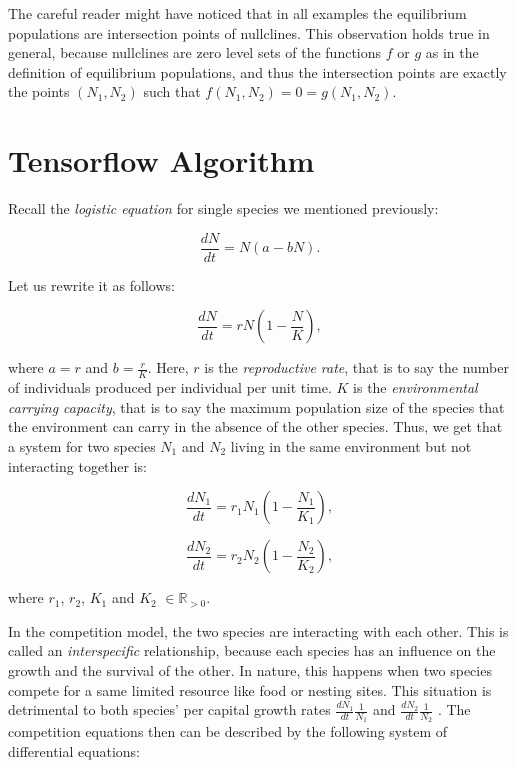 \documentclass[11pt,a4paper]{scrartcl}
\theoremstyle{definition}
\begin{document}
The careful reader might have noticed that in all examples the equilibrium populations are intersection points of nullclines. This observation holds true in general, because nullclines are zero level sets of the functions $f$ or $g$ as in the definition of equilibrium populations, and thus the intersection points are exactly the points $(N_1,N_2)$ such that $f(N_1,N_2)=0=g(N_1,N_2)$.

\FloatBarrier

\section{Tensorflow Algorithm}

Recall the \textit{logistic equation} for single species we mentioned previously:

\begin{equation} \tag{3}
	\frac{dN}{dt}=N(a-bN). 
\end{equation}

Let us rewrite it as follows:

\begin{equation} \label{eq9}
	\frac{dN}{dt}=rN(1-\frac{N}{K}), 
\end{equation}

where $a=r$ and $b=\frac{r}{K}$. Here, $r$ is the \textit{reproductive rate}, that is to say the number of individuals produced per individual per unit time. $K$ is the \textit{environmental carrying capacity}, that is to say the maximum population size of the species that the environment can carry in the absence of the other species\cite{Murray}. Thus, we get that a system for two species $N_1$ and $N_2$ living in the same environment but not interacting together is:

\begin{equation} \label{eq10}
	\frac{dN_1}{dt}=r_1N_1(1-\frac{N_1}{K_1}),
\end{equation}

\begin{equation} \label{eq11}
	\frac{dN_2}{dt}=r_2N_2(1-\frac{N_2}{K_2}),
\end{equation}

where $r_1$, $r_2$, $K_1$ and $K_2$ $\in \mathbb{R}_{>0}$.
\newline

In the competition model, the two species are interacting with each other. This is called an \textit{interspecific} relationship, because each species has an influence on the growth and the survival of the other. In nature, this happens when two species compete for a same limited resource like food or nesting sites. This situation is detrimental to both species' per capital growth rates $\frac{dN_1}{dt}\frac{1}{N_1}$ and $\frac{dN_2}{dt}\frac{1}{N_2}$ \cite{main}. The competition equations then can be described by the following system of differential equations:
\end{document}
